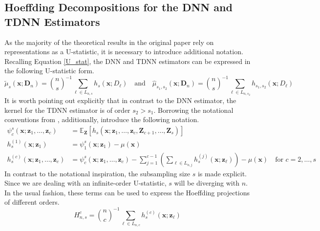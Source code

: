 \documentclass[letterpaper,10pt]{article}
\numberwithin{equation}{section}
\numberwithin{thm}{section}
\renewcommand{\hat}{\widehat}
\newcommand{\1}{\mathbb{1}}
\begin{document}
\subsection{Hoeffding Decompositions for the DNN and TDNN Estimators}
As the majority of the theoretical results in the original paper rely on representations as a U-statistic, it is necessary to introduce additional notation.
Recalling Equation \ref{U_stat}, the DNN and TDNN estimators can be expressed in the following U-statistic form.
\begin{equation}
	\tilde{\mu}_{s}(\mathbf{x}; \mathbf{D}_n)
	= \binom{n}{s}^{-1} \sum_{\ell \in L_{n,s}} h_{s}(\mathbf{x}; D_{\ell})
	\quad \text{and} \quad
	\hat{\mu}_{s_1, s_2}(\mathbf{x}; \mathbf{D}_n)
	= \binom{n}{s}^{-1} \sum_{\ell \in L_{n,s_2}} h_{s_1, s_2}(\mathbf{x}; D_{\ell})
\end{equation}
It is worth pointing out explicitly that in contrast to the DNN estimator, the kernel for the TDNN estimator is of order $s_2 > s_1$.
Borrowing the notational conventions from \citet{lee_u-statistics_2019}, additionally, introduce the following notation.
\begin{align}
	\psi_{c}^{s}(\mathbf{x}; \mathbf{z}_{1}, \dotsc, \mathbf{z}_{c})
	 & = \mathbb{E}_{\mathbf{Z}}\left[h_{s}\left(\mathbf{x}; \mathbf{z}_{1}, \dotsc, \mathbf{z}_{c}, \mathbf{Z}_{c+1}, \dotsc, \mathbf{Z}_{s}\right)\right]                                    \\
	h_{s}^{(1)}\left(\mathbf{x}; \mathbf{z}_{1}\right)
	 & = \psi_{1}^{s}(\mathbf{x}; \mathbf{z}_{1}) - \mu(\mathbf{x})                                                                                                                            \\
	h_{s}^{(c)}\left(\mathbf{x}; \mathbf{z}_{1}, \dotsc, \mathbf{z}_{c}\right)
	 & = \psi_{c}^{s}(\mathbf{x}; \mathbf{z}_{1}, \dotsc, \mathbf{z}_{c}) - \sum_{j = 1}^{c-1}\left(\sum_{\ell \in L_{n,j}}h_{s}^{(j)}(\mathbf{x}; \mathbf{z}_{\ell})\right) - \mu(\mathbf{x})
	\quad \text{for } c = 2, \dotsc, s
\end{align}
In contrast to the notational inspiration, the subsampling size $s$ is made explicit.
Since we are dealing with an infinite-order U-statistic, $s$ will be diverging with $n$.
In the usual fashion, these terms can be used to express the Hoeffding projections of different orders.
\begin{equation}
	H_{n,s}^{c}
	= \binom{n}{c}^{-1} \sum_{\ell \in L_{n,c}} h^{(c)}_{s}(\mathbf{x}; \mathbf{z}_{\ell})
\end{equation}
\end{document}
